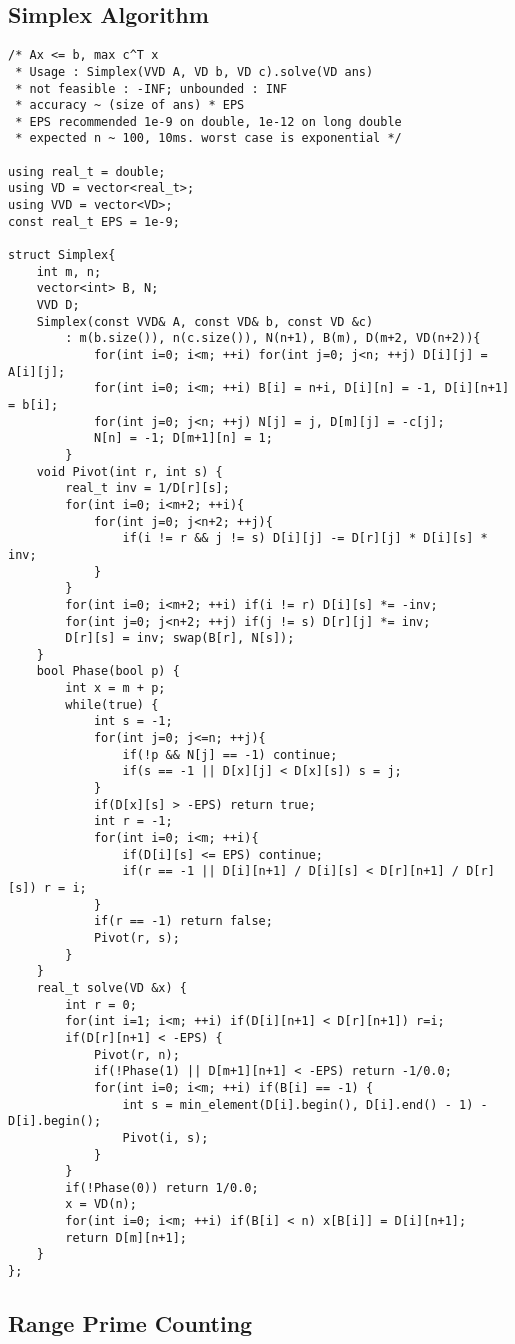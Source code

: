 \documentclass[landscape, 8pt, a4paper, oneside,  twocolumn]{extarticle}
\begin{document}
\subsection{Simplex Algorithm}
\begin{verbatim}
/* Ax <= b, max c^T x
 * Usage : Simplex(VVD A, VD b, VD c).solve(VD ans)
 * not feasible : -INF; unbounded : INF
 * accuracy ~ (size of ans) * EPS
 * EPS recommended 1e-9 on double, 1e-12 on long double
 * expected n ~ 100, 10ms. worst case is exponential */

using real_t = double;
using VD = vector<real_t>;
using VVD = vector<VD>;
const real_t EPS = 1e-9;

struct Simplex{
	int m, n;
	vector<int> B, N;
	VVD D;
	Simplex(const VVD& A, const VD& b, const VD &c)
		: m(b.size()), n(c.size()), N(n+1), B(m), D(m+2, VD(n+2)){
			for(int i=0; i<m; ++i) for(int j=0; j<n; ++j) D[i][j] = A[i][j];
			for(int i=0; i<m; ++i) B[i] = n+i, D[i][n] = -1, D[i][n+1] = b[i];
			for(int j=0; j<n; ++j) N[j] = j, D[m][j] = -c[j];
			N[n] = -1; D[m+1][n] = 1;
		}
	void Pivot(int r, int s) {
		real_t inv = 1/D[r][s];
		for(int i=0; i<m+2; ++i){
			for(int j=0; j<n+2; ++j){
				if(i != r && j != s) D[i][j] -= D[r][j] * D[i][s] * inv;
			}
		}
		for(int i=0; i<m+2; ++i) if(i != r) D[i][s] *= -inv;
		for(int j=0; j<n+2; ++j) if(j != s) D[r][j] *= inv;
		D[r][s] = inv; swap(B[r], N[s]);
	}
	bool Phase(bool p) {
		int x = m + p;
		while(true) {
			int s = -1;
			for(int j=0; j<=n; ++j){
				if(!p && N[j] == -1) continue;
				if(s == -1 || D[x][j] < D[x][s]) s = j;
			}
			if(D[x][s] > -EPS) return true;
			int r = -1;
			for(int i=0; i<m; ++i){
				if(D[i][s] <= EPS) continue;
				if(r == -1 || D[i][n+1] / D[i][s] < D[r][n+1] / D[r][s]) r = i;
			}
			if(r == -1) return false;
			Pivot(r, s);
		}
	}
	real_t solve(VD &x) {
		int r = 0;
		for(int i=1; i<m; ++i) if(D[i][n+1] < D[r][n+1]) r=i;
		if(D[r][n+1] < -EPS) {
			Pivot(r, n);
			if(!Phase(1) || D[m+1][n+1] < -EPS) return -1/0.0;
			for(int i=0; i<m; ++i) if(B[i] == -1) {
				int s = min_element(D[i].begin(), D[i].end() - 1) - D[i].begin();
				Pivot(i, s);
			}
		}
		if(!Phase(0)) return 1/0.0;
		x = VD(n);
		for(int i=0; i<m; ++i) if(B[i] < n) x[B[i]] = D[i][n+1];
		return D[m][n+1];
	}
};
\end{verbatim}

\subsection{Range Prime Counting}
\end{document}
